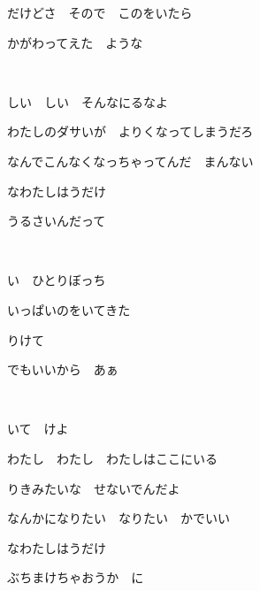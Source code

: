 だけどさ　そので　このをいたら

かがわってえた　ような

~

しい　しい　そんなにるなよ

わたしのダサいが　よりくなってしまうだろ

なんでこんなくなっちゃってんだ　まんない

なわたしはうだけ

うるさいんだって　

~

い　ひとりぼっち

いっぱいのをいてきた

りけて　

でもいいから　あぁ

~

いて　けよ

わたし　わたし　わたしはここにいる

りきみたいな　せないでんだよ

なんかになりたい　なりたい　かでいい

なわたしはうだけ

ぶちまけちゃおうか　に

